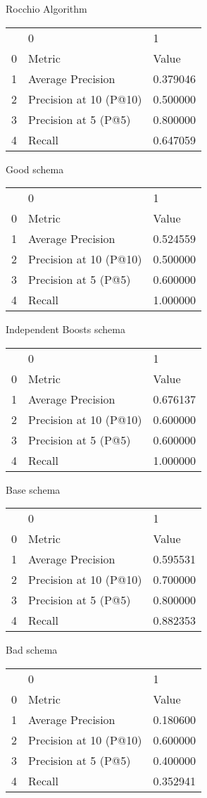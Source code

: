 

Rocchio Algorithm
\begin{tabular}{lll}
 & 0 & 1 \\
0 & Metric & Value \\
1 & Average Precision & 0.379046 \\
2 & Precision at 10 (P@10) & 0.500000 \\
3 & Precision at 5 (P@5) & 0.800000 \\
4 & Recall & 0.647059 \\
\end{tabular}


Good schema
\begin{tabular}{lll}
 & 0 & 1 \\
0 & Metric & Value \\
1 & Average Precision & 0.524559 \\
2 & Precision at 10 (P@10) & 0.500000 \\
3 & Precision at 5 (P@5) & 0.600000 \\
4 & Recall & 1.000000 \\
\end{tabular}


Independent Boosts schema
\begin{tabular}{lll}
 & 0 & 1 \\
0 & Metric & Value \\
1 & Average Precision & 0.676137 \\
2 & Precision at 10 (P@10) & 0.600000 \\
3 & Precision at 5 (P@5) & 0.600000 \\
4 & Recall & 1.000000 \\
\end{tabular}


Base schema
\begin{tabular}{lll}
 & 0 & 1 \\
0 & Metric & Value \\
1 & Average Precision & 0.595531 \\
2 & Precision at 10 (P@10) & 0.700000 \\
3 & Precision at 5 (P@5) & 0.800000 \\
4 & Recall & 0.882353 \\
\end{tabular}


Bad schema
\begin{tabular}{lll}
 & 0 & 1 \\
0 & Metric & Value \\
1 & Average Precision & 0.180600 \\
2 & Precision at 10 (P@10) & 0.600000 \\
3 & Precision at 5 (P@5) & 0.400000 \\
4 & Recall & 0.352941 \\
\end{tabular}
